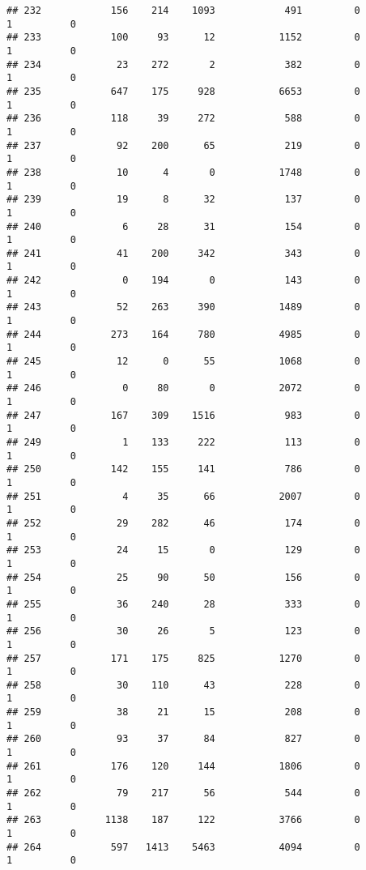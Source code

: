 \documentclass[
]{article}
\begin{document}
\begin{verbatim}
## 232            156    214    1093            491         0         1          0
## 233            100     93      12           1152         0         1          0
## 234             23    272       2            382         0         1          0
## 235            647    175     928           6653         0         1          0
## 236            118     39     272            588         0         1          0
## 237             92    200      65            219         0         1          0
## 238             10      4       0           1748         0         1          0
## 239             19      8      32            137         0         1          0
## 240              6     28      31            154         0         1          0
## 241             41    200     342            343         0         1          0
## 242              0    194       0            143         0         1          0
## 243             52    263     390           1489         0         1          0
## 244            273    164     780           4985         0         1          0
## 245             12      0      55           1068         0         1          0
## 246              0     80       0           2072         0         1          0
## 247            167    309    1516            983         0         1          0
## 249              1    133     222            113         0         1          0
## 250            142    155     141            786         0         1          0
## 251              4     35      66           2007         0         1          0
## 252             29    282      46            174         0         1          0
## 253             24     15       0            129         0         1          0
## 254             25     90      50            156         0         1          0
## 255             36    240      28            333         0         1          0
## 256             30     26       5            123         0         1          0
## 257            171    175     825           1270         0         1          0
## 258             30    110      43            228         0         1          0
## 259             38     21      15            208         0         1          0
## 260             93     37      84            827         0         1          0
## 261            176    120     144           1806         0         1          0
## 262             79    217      56            544         0         1          0
## 263           1138    187     122           3766         0         1          0
## 264            597   1413    5463           4094         0         1          0

\end{verbatim}
\end{document}
